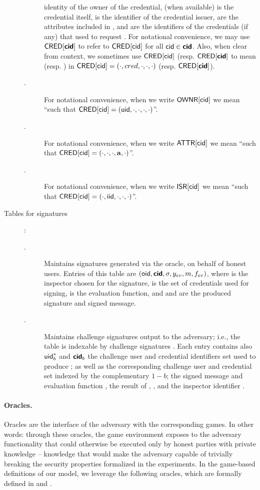 \begin{description}
\begin{description}
    identity of the owner of the credential, \cred (when available) is the
    credential itself, \iid is the identifier of the credential issuer, \attrs
    are the attributes included in \cred, and \scid are the identifiers of the
    credentials (if any) that \uid used to request \cred. For notational
    convenience, we may use $\mathsf{CRED}[\boldsymbol{\mathsf{cid}}]$ to refer to $\mathsf{CRED}[\mathsf{cid}]$ for all
    $\mathsf{cid} \in \boldsymbol{\mathsf{cid}}$. Also, when clear from context, we sometimes use
    $\mathsf{CRED}[\mathsf{cid}]$ (resp. $\mathsf{CRED}[\boldsymbol{\mathsf{cid}}]$ to mean \cred (resp. \scred) in
    $\mathsf{CRED}[\mathsf{cid}] = (\cdot,cred,\cdot,\cdot,\cdot)$ (resp. $\mathsf{CRED}[\boldsymbol{\mathsf{cid}}]$).
  \item[\OWNR.] For notational convenience, when we write $\mathsf{OWNR}[\mathsf{cid}]$ we mean
    ``\uid such that $\mathsf{CRED}[\mathsf{cid}] = (\mathsf{uid}, \cdot, \cdot, \cdot, \cdot)$''.
  \item[\ATTR.] For notational convenience, when we write $\mathsf{ATTR}[\mathsf{cid}]$ we mean
    ``\attrs such that $\mathsf{CRED}[\mathsf{cid}] = (\cdot, \cdot, \cdot, \mathbf{a}, \cdot)$''.
  \item[\ISR.] For notational convenience, when we write $\mathsf{ISR}[\mathsf{cid}]$ we mean
    ``\iid such that $\mathsf{CRED}[\mathsf{cid}] = (\cdot, \mathsf{iid}, \cdot, \cdot, \cdot)$''.
  \end{description}
\item[Tables for signatures]:
  \begin{description}
  \item[\SIG.] Maintains signatures generated via the \SIGN oracle, on behalf
    of honest users. Entries of this table are $(\mathsf{oid},\boldsymbol{\mathsf{cid}},\sigma,y_{ev},m,
    f_{ev})$, where \oid is the inspector chosen for the signature, \scid is the
    set of credentials used for signing, \feval is the evaluation function, and
    \sig and \msg are the produced signature and signed message.
  \item[\CSIG.] Maintains challenge signatures output to the adversary; i.e.,
    the table is indexable by challenge signatures \csig.
    Each entry contains also $\mathsf{uid}^*_b$ and $\boldsymbol{\mathsf{cid}}_b$ the challenge user and
    credential identifiers set used to produce \csig; as well as the
    corresponding challenge user and credential set indexed by the complementary
    $1-b$; the signed message \msg and evaluation function \feval, the result of
    \feval, \yeval, and the inspector identifier \oid.
  \end{description}
\end{description}

\paragraph{Oracles.} %
Oracles are the interface of the adversary with the corresponding games. In
other words: through these oracles, the game environment exposes to the adversary
functionality that could otherwise be executed only by honest parties with
private knowledge -- knowledge that would make the adversary capable of
trivially breaking the security properties formalized in the experiments.
In the game-based definitions of our \UAS model, we leverage the following
oracles, which are formally defined in  and
. 

